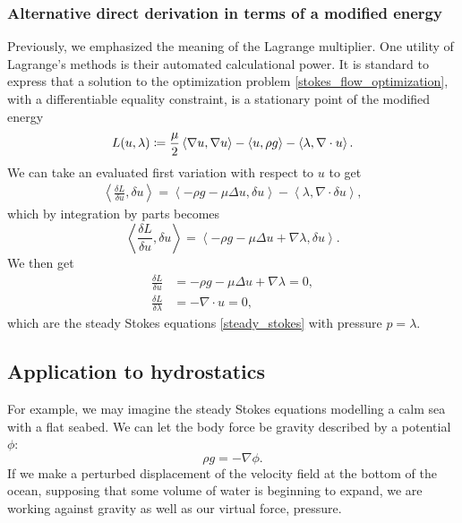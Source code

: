 \documentclass[11pt,a4paper]{memoir}
\newcommand{\inner}[1]{\left<#1\right>}
\begin{document}
\subsubsection{Alternative direct derivation in terms of a modified energy}
Previously, we emphasized the meaning of the Lagrange multiplier. One utility of Lagrange's methods is their automated calculational power.
It is standard to express that a solution to the optimization
problem \eqref{stokes_flow_optimization}, with a differentiable equality constraint, is a stationary point of the modified energy
\begin{equation}\label{stokes_flow_modified_energy}
    L(u, \lambda) \coloneqq \frac{\mu}{2} \inner{\nabla u, \nabla u} - \inner{u, \rho g} - \inner{\lambda, \nabla\cdot u}.\\
\end{equation}
We can take an evaluated first variation with respect to $u$ to get
\begin{align*}
    \inner{\frac{\delta L}{\delta u}, \delta u} = \inner{-\rho g - \mu\Delta u, \delta u} - \inner{\lambda, \nabla\cdot\delta u},
\end{align*}
which by integration by parts becomes
\begin{equation}
    \inner{\frac{\delta L}{\delta u}, \delta u} = \inner{-\rho g - \mu\Delta u + \nabla \lambda, \delta u}.
\end{equation}
We then get
\begin{equation}
\begin{split}
    \frac{\delta L}{\delta u} &= -\rho g - \mu\Delta u + \nabla \lambda = 0,\\
    \frac{\delta L}{\delta \lambda} &= -\nabla\cdot u = 0,
\end{split}
\end{equation}
which are the steady Stokes equations \eqref{steady_stokes} with pressure $p = \lambda$.



\subsection{Application to hydrostatics}
For example, we may imagine the steady Stokes equations modelling a calm sea with a flat seabed.
We can let the body force be gravity described by a potential $\phi$:
    $$\rho g = -\nabla \phi.$$
If we make a perturbed displacement of the velocity field at the bottom of the ocean, supposing that some volume of water
is beginning to expand,
we are working against gravity as well as our virtual force, pressure.
\end{document}
